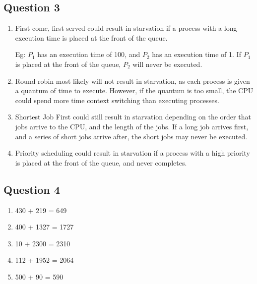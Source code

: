\documentclass{article}
\begin{document}
\subsection*{Question 3}
\begin{enumerate}[label=\alph*.]
    \item First-come, first-served could result in starvation if a process with
          a long execution time is placed at the front of the queue.

          Eg: \(P_1\) has an execution time of 100, and \(P_2\) has an execution
          time of 1. If \(P_1\) is placed at the front of the queue, \(P_2\)
          will never be executed.
    \item Round robin most likely will not result in starvation, as each process
          is given a quantum of time to execute. However, if the quantum is too
          small, the CPU could spend more time context switching than executing
          processes.
    \item Shortest Job First could still result in starvation depending on the
          order that jobs arrive to the CPU, and the length of the jobs. If a long job
          arrives first, and a series of short jobs arrive after, the short jobs may
          never be executed.
    \item Priority scheduling could result in starvation if a process with a high
          priority is placed at the front of the queue, and never completes.
\end{enumerate}

\subsection*{Question 4}
\begin{enumerate}[label=\alph*.]
    \item 430 + 219 = 649
    \item 400 + 1327 = 1727
    \item 10 + 2300 = 2310
    \item 112 + 1952 = 2064
    \item 500 + 90 = 590
\end{enumerate}
\end{document}
